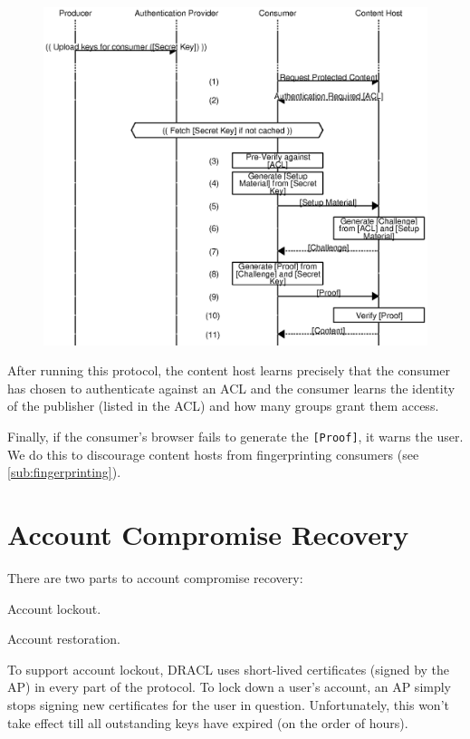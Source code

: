 \documentclass[pdftex,12pt,a4papaer]{report}
\begin{document}
\begin{figure}[H]
    \includegraphics{auth.eps}
\end{figure}

After running this protocol, the content host learns precisely that the consumer
has chosen to authenticate against an ACL and the consumer learns the identity
of the publisher (listed in the ACL) and how many groups grant them access.

Finally, if the consumer's browser fails to generate the \verb=[Proof]=, it
warns the user. We do this to discourage content hosts from fingerprinting
consumers (see \ref{sub:fingerprinting}).

\section{Account Compromise Recovery}

There are two parts to account compromise recovery:

\begin{compactenum}
\item Account lockout.
\item Account restoration.
\end{compactenum}

To support account lockout, DRACL uses short-lived certificates (signed by the
AP) in every part of the protocol. To lock down a user's account, an AP simply
stops signing new certificates for the user in question. Unfortunately, this
won't take effect till all outstanding keys have expired (on the order of
hours).
\end{document}

